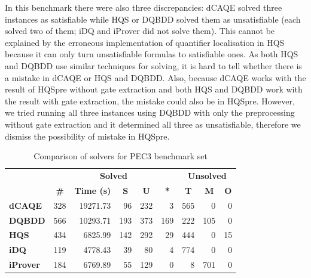 \documentclass[
  digital, %
  color,
  twoside, %
  table,   %
  nolof,     %
  nolot,     %
]{fithesis3}
\theoremstyle{definition}
\theoremstyle{remark}
\begin{document}
In this benchmark there were also three discrepancies: dCAQE solved three instances as satisfiable while HQS or DQBDD solved them as unsatisfiable (each solved two of them; iDQ and iProver did not solve them). This cannot be explained by the erroneous implementation of quantifier localisation in HQS because it can only turn unsatisfiable formulas to satisfiable ones. As both HQS and DQBDD use similar techniques for solving, it is hard to tell whether there is a mistake in dCAQE or HQS and DQBDD. Also, because dCAQE works with the result of HQSpre without gate extraction and both HQS and DQBDD work with the result with gate extraction, the mistake could also be in HQSpre. However, we tried running all three instances using DQBDD with only the preprocessing without gate extraction and it determined all three as unsatisfiable, therefore we dismiss the possibility of mistake in HQSpre.

\begin{table}[ht]
\centering
\caption{Comparison of solvers for PEC3 benchmark set}%
\label{tab:PEC3}
\begin{tabular}{|l|r|r|r|r|r|r|r|r|}
\hline
\multicolumn{1}{|c|}{}                                  & \multicolumn{5}{c|}{\textbf{Solved}}                                                                                                                                        & \multicolumn{3}{c|}{\textbf{Unsolved}}                                                                 \\  \hhline{~*{8}{-}}
\multicolumn{1}{|c|}{\multirow{-2}{*}{\textbf{Solver}}} & \multicolumn{1}{c|}{\textbf{\#}} & \multicolumn{1}{c|}{\textbf{Time (s)}} & \multicolumn{1}{c|}{\textbf{S}} & \multicolumn{1}{c|}{\textbf{U}} & \multicolumn{1}{c|}{\textbf{*}} & \multicolumn{1}{c|}{\textbf{T}} & \multicolumn{1}{c|}{\textbf{M}} & \multicolumn{1}{c|}{\textbf{O}} \\ \hline
\textbf{dCAQE} & \num{328} & \num{19271.73} & \num{96} & \num{232} & \num{3} & \num{565} & \num{0} & \num{0} \\ \hline
\textbf{DQBDD} & \num{566} & \num{10293.71} & \num{193} & \num{373} & \num{169} & \num{222} & \num{105} & \num{0} \\ \hline
\textbf{HQS} & \num{434} & \num{6825.99} & \num{142} & \num{292} & \num{29} & \num{444} & \num{0} & \num{15} \\ \hline
\textbf{iDQ} & \num{119} & \num{4778.43} & \num{39} & \num{80} & \num{4} & \num{774} & \num{0} & \num{0} \\ \hline
\textbf{iProver} & \num{184} & \num{6769.89} & \num{55} & \num{129} & \num{0} & \num{8} & \num{701} & \num{0} \\ \hline
\end{tabular}
\end{table}
\end{document}
